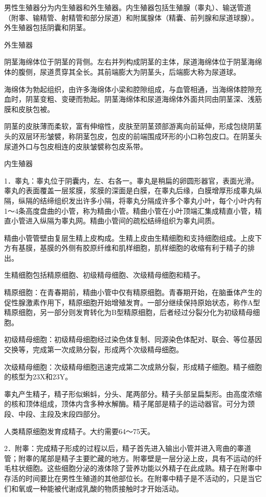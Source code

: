 \documentclass[12pt,UTF8]{ctexbook}
\begin{document}
男性生殖器分为内生殖器和外生殖器。内生殖器包括生殖腺（睾丸）、输送管道（附睾、输精管、射精管和部分尿道）和附属腺体（精囊、前列腺和尿道球腺）。外生殖器包括阴囊和阴茎。

外生殖器

阴茎海绵体位于阴茎的背侧。左右并列构成阴茎的主体，尿道海绵体位于阴茎海绵体的腹侧，尿道贯穿其全长。其前端膨大为阴茎头，后端膨大称为尿道球。

海绵体为勃起组织，由许多海绵体小梁和腔隙组成，与血管相通，当海绵体腔隙充血时，阴茎变粗、变硬而勃起。阴茎海绵体和尿道海绵体外面共同由阴茎深、浅筋膜和皮肤包被。

阴茎的皮肤薄而柔软，富有伸缩性，皮肤至阴茎颈部游离向前延伸，形成包绕阴茎头的双层环形皱襞，称阴茎包皮，包皮的前端围成环形的小口称包皮口。在阴茎头尿道外口与包皮相连的皮肤皱襞称包皮系带。

内生殖器

1．睾丸：睾丸位于阴囊内，左、右各一。睾丸是稍扁的卵圆形器官，表面光滑。睾丸的表面覆盖一层浆膜，浆膜的深面是白膜，在睾丸后缘，白膜增厚形成睾丸纵隔，纵隔的结缔组织发出许多小隔，将睾丸分隔成许多个睾丸小叶，每个小叶内有1～4条高度盘曲的小管，称为精曲小管。精曲小管在小叶顶端汇集成精直小管，精直小管进入纵隔为睾丸网。精曲小管间的疏松结缔组织为睾丸间质。

精曲小管管壁由复层生精上皮构成。生精上皮由生精细胞和支持细胞组成。上皮下方有基膜，基膜的外侧有胶原纤维和肌样细胞，肌样细胞的收缩有利于精子的排出。

生精细胞包括精原细胞、初级精母细胞、次级精母细胞和精子。

精原细胞：在青春期前，精曲小管中仅有精原细胞。青春期开始，在脑垂体产生的促性腺激素作用下，精原细胞开始增殖发育。一部分继续保持原始状态，称作A型精原细胞，另一部分则发育转化为B型精原细胞，后者经过分裂分化为初级精母细胞。

初级精母细胞：初级精母细胞经过染色体复制、同源染色体配对、联会、等位基因交换等，完成第一次成熟分裂，形成两个次级精母细胞。

次级精母细胞：次级精母细胞迅速完成第二次成熟分裂，形成精子细胞。精子细胞的核型为23X和23Y。

睾丸产生精子，精子形似蝌蚪，分头、尾两部分。精子头部呈扁梨形。由高度浓缩的核和顶体组成，顶体内含多种水解酶。精子尾部是精子的运动器官。可分为颈段、中段、主段及末段四部分。

人类精原细胞发育成精子。大约需要64～75天。

2．附睾：完成精子形成的过程以后，精子首先进入输出小管并进入弯曲的睾道管；附睾的尾部是精子主要贮藏的地方。附睾壁是一层分泌上皮，具有不运动的纤毛柱状细胞。这些细胞分泌的液体除了营养功能以外精子在此成熟。精子在附睾中存活的时间要比在男性生殖道的其他部位长。在附睾中精子是不活动的，只是当它们和氧或一种能被代谢成乳酸的物质接触时才开始活动。
\end{document}
